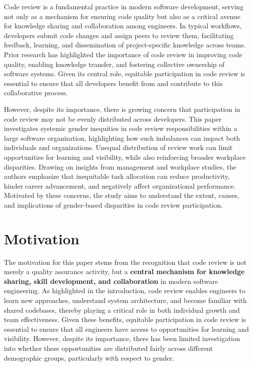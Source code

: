 Code review is a fundamental practice in modern software development, serving not only as a mechanism for ensuring code quality but also as a critical avenue for knowledge sharing and collaboration among engineers. In typical workflows, developers submit code changes and assign peers to review them, facilitating feedback, learning, and dissemination of project-specific knowledge across teams. Prior research has highlighted the importance of code review in improving code quality, enabling knowledge transfer, and fostering collective ownership of software systems. Given its central role, equitable participation in code review is essential to ensure that all developers benefit from and contribute to this collaborative process.

However, despite its importance, there is growing concern that participation in code review may not be evenly distributed across developers. This paper investigates systemic gender inequities in code review responsibilities within a large software organization, highlighting how such imbalances can impact both individuals and organizations. Unequal distribution of review work can limit opportunities for learning and visibility, while also reinforcing broader workplace disparities. Drawing on insights from management and workplace studies, the authors emphasize that inequitable task allocation can reduce productivity, hinder career advancement, and negatively affect organizational performance. Motivated by these concerns, the study aims to understand the extent, causes, and implications of gender-based disparities in code review participation.

\section{Motivation}
The motivation for this paper stems from the recognition that code review is not merely a quality assurance activity, but a \textbf{central mechanism for knowledge sharing, skill development, and collaboration} in modern software engineering. As highlighted in the introduction, code review enables engineers to learn new approaches, understand system architecture, and become familiar with shared codebases, thereby playing a critical role in both individual growth and team effectiveness. Given these benefits, equitable participation in code review is essential to ensure that all engineers have access to opportunities for learning and visibility. However, despite its importance, there has been limited investigation into whether these opportunities are distributed fairly across different demographic groups, particularly with respect to gender.

